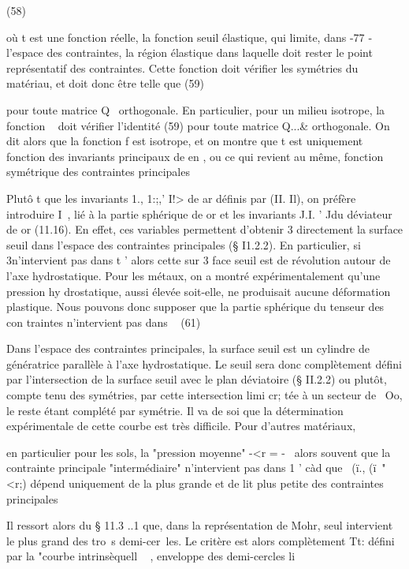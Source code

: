 {{(58) 

où t est une fonction réelle, la fonction seuil élastique, qui limite, dans 
-77 ­
l'espace des contraintes, la région élastique dans laquelle doit rester le point représentatif des contraintes. 
Cette fonction doit vérifier les symétries du matériau, et doit donc être telle que 
(59) 


pour toute matrice Q~ orthogonale. En particulier, pour un milieu isotrope, la fonction ~ doit vérifier l'identité (59) pour toute matrice Q...& ortho­gonale. On dit alors que la fonction f est isotrope, et on montre que t 
est uniquement fonction des invariants principaux de en , ou ce qui revient au même, fonction symétrique des contraintes principales 

Plutô t que les invariants 1., 1:;,' I!> de ar définis par (II. Il), on préfè­re introduire I~, lié à la partie sphérique de or et les invariants J.I. ' Jdu déviateur de or (11.16). En effet, ces variables permettent d'obtenir
3 directement la surface seuil dans l'espace des contraintes principales 
(§ I1.2.2). En particulier, si 3n'intervient pas dans t ' alors cette sur­
3 face seuil est de révolution autour de l'axe hydrostatique. 
Pour les métaux, on a montré expérimentalement qu'une pression hy­
drostatique, aussi élevée soit-elle, ne produisait aucune déformation plasti­que. Nous pouvons donc supposer que la partie sphérique du tenseur des con­
traintes n'intervient pas dans ~ 
(61) 


Dans l'espace des contraintes principales, la surface seuil est un cylindre de génératrice parallèle à l'axe hydrostatique. Le seuil sera donc complète­ment défini par l'intersection de la surface seuil avec le plan déviatoire (§ II.2.2) ou plutôt, compte tenu des symétries, par cette intersection limi­
cr;
tée à un secteur de ~Oo, le reste étant complété par symétrie. Il va de soi que la détermination expérimentale de cette courbe est 
très difficile. 
Pour d'autres matériaux, 

en particulier pour les sols, la "pression moyenne" -<r = -~ 
alors souvent que la contrainte principale "intermédiaire" n'intervient pas 
dans 1 ' càd que ~(ï., (ï~" <r;) dépend uniquement de la plus grande et de lit plus petite des contraintes principales 

Il ressort alors du § 11.3 ..1 que, dans la représentation de Mohr, seul inter­vient le plus grand des tro~s demi-cer~les. Le critère est alors complètement 
Tt: 
défini par la "courbe intrinsèquell 
~ , enveloppe des demi-cercles li­

}}
